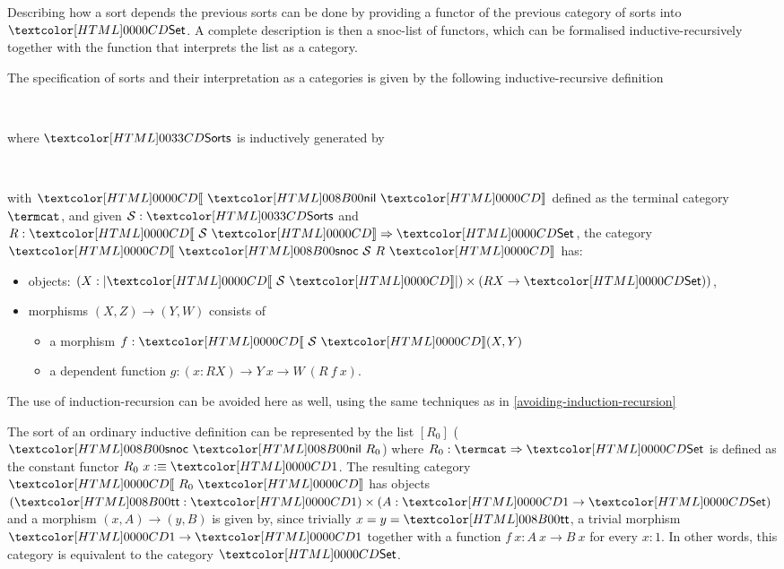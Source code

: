 Describing how a sort depends the previous sorts can be done by
providing a functor of the previous category of sorts into $\Set$. A
complete description is then a snoc-list of functors, which can be
formalised inductive-recursively together with the function that
interprets the list as a category.
% 
\begin{definition}
  The specification of sorts and their interpretation as a
  categories is given by the following inductive-recursive
  definition
  \begin{sorts}
    \sortnamety{\sortsty}{\Set} \\
    \functy{\SortCat{\_}}{\sortsty \to \Cat}
  \end{sorts}
  where $\sortsty$ is inductively generated by
  \begin{datatype}{\sortsty}{}
    \constr{\sortsnil}{\sortsty} \\
    \constr{\sortssnoc}{(\Ss : \sortsty) \to (\Func{\SortCat{\Ss}}{\Set}) \to \sortsty}
  \end{datatype}
  with $\SortCat{\sortsnil}$ defined as the terminal category $\termcat$, and given
  $\Ss : \sortsty$ and $R : \Func{\SortCat{\Ss}}{\Set}$,
  the category $\SortCat{\sortssnoc\ \Ss\ R}$ has:
  \begin{itemize}
  \item objects: $(X : | \SortCat{\Ss} |) \times (R X \to \Set))$,
  \item morphisms $(X,Z) \to (Y,W)$ consists of
    \begin{itemize}
    \item a morphism $f : \SortCat{\Ss}(X,Y)$
    \item a dependent function
      $g : (x : R X) \to Y\ x \to W\ (R\ f\ x)$.
    \end{itemize}
  \end{itemize}
\end{definition}

\begin{remark}
  The use of induction-recursion can be avoided here as well, using
  the same techniques as in \cref{avoiding-induction-recursion}
\end{remark}

\begin{example}
  The sort of an ordinary inductive definition can be represented by
  the list $[R_0]$ (\ie $\sortssnoc\ \sortsnil\ R_0$) where
  $R_0 : \Func{\termcat}{\Set}$ is defined as the constant functor
  $R_0\ x \ddefeq \unitty$. The resulting category $\SortCat{R_0}$ has
  objects $(\unitval : \unitty) \times (A : \unitty \to \Set)$ and a
  morphism $(x, A) \to (y, B)$ is given by, since trivially
  $x = y = \unitval$, a trivial morphism $\unitty \to \unitty$
  together with a function $f\ x : A\ x \to B\ x$ for every $x : 1$. In
  other words, this category is equivalent to the category $\Set$.
\end{example}

